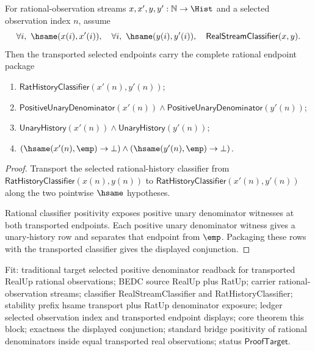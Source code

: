 \begin{theorem}
\label{thm:real-stream-classifier-transport-selected-positive-unary-nonempty-package}
For rational-observation streams $x,x',y,y':\mathbb{N}\to\Hist$ and a selected
observation index $n$, assume
$$
\forall i,\ \hsame(x(i),x'(i)),\quad
\forall i,\ \hsame(y(i),y'(i)),\quad
\mathsf{RealStreamClassifier}(x,y).
$$
Then the transported selected endpoints carry the complete rational endpoint
package
\begin{enumerate}
\item $\mathsf{RatHistoryClassifier}(x'(n),y'(n))$;
\item $\mathsf{PositiveUnaryDenominator}(x'(n))\land
\mathsf{PositiveUnaryDenominator}(y'(n))$;
\item $\mathsf{UnaryHistory}(x'(n))\land\mathsf{UnaryHistory}(y'(n))$;
\item $(\hsame(x'(n),\emp)\to\bot)\land
(\hsame(y'(n),\emp)\to\bot)$.
\end{enumerate}
\end{theorem}
\begin{proof}
Transport the selected rational-history classifier from
$\mathsf{RatHistoryClassifier}(x(n),y(n))$ to
$\mathsf{RatHistoryClassifier}(x'(n),y'(n))$ along the two pointwise
$\hsame$ hypotheses.

Rational classifier positivity exposes positive unary denominator witnesses at
both transported endpoints. Each positive unary denominator witness gives a
unary-history row and separates that endpoint from $\emp$. Packaging these rows
with the transported classifier gives the displayed conjunction.
\end{proof}

Fit: traditional target selected positive denominator readback for transported
RealUp rational observations; BEDC source RealUp plus RatUp; carrier
rational-observation streams; classifier RealStreamClassifier and
RatHistoryClassifier; stability prefix hsame transport plus RatUp denominator
exposure; ledger selected observation index and transported endpoint displays;
core theorem this block; exactness the displayed conjunction; standard bridge
positivity of rational denominators inside equal transported real observations;
status $\mathsf{ProofTarget}$.

